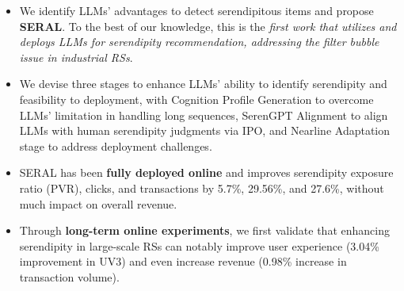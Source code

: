 \begin{itemize}
    \item We identify LLMs' advantages to detect serendipitous items and propose \textbf{SERAL}. To the best of our knowledge, this is the \textit{first work that utilizes and deploys LLMs for serendipity recommendation, addressing the filter bubble issue in industrial RSs}.
    \item We devise three stages to enhance LLMs' ability to identify serendipity and feasibility to deployment, with Cognition Profile Generation to overcome LLMs' limitation in handling long sequences, SerenGPT Alignment to align LLMs with human serendipity judgments via IPO, and Nearline Adaptation stage to address deployment challenges.
    \item SERAL has been \textbf{fully deployed online} and improves serendipity exposure ratio (PVR), clicks, and transactions by 5.7\%, 29.56\%, and 27.6\%, without much impact on overall revenue. 
    \item Through \textbf{long-term online experiments}, we first validate that enhancing serendipity in large-scale RSs can notably improve user experience (3.04\% improvement in UV3) and even increase revenue (0.98\% increase in transaction volume).
\end{itemize}










